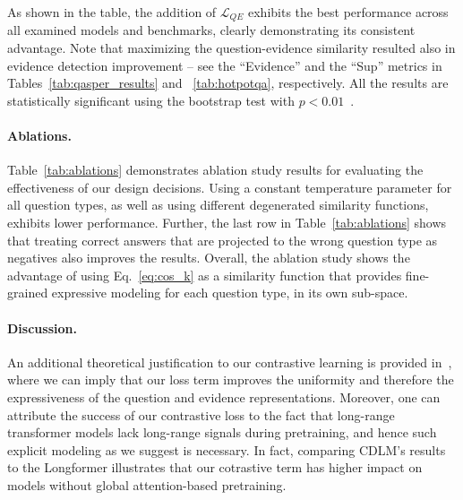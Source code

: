 As shown in the table, the addition of $\mathcal{L}_{QE}$ exhibits the best performance across all examined models and benchmarks, clearly demonstrating its consistent advantage. Note that maximizing the question-evidence similarity resulted also in evidence detection improvement -- see the ``Evidence'' and the ``Sup'' metrics in Tables~\ref{tab:qasper_results} and ~\ref{tab:hotpotqa}, respectively. All the results are statistically significant using the bootstrap test with ${p<0.01}$~\cite{dror-etal-2018-hitchhikers}.

\paragraph{Ablations.} Table~\ref{tab:ablations} demonstrates ablation study results for evaluating the effectiveness of our design decisions. Using a constant temperature parameter for all question types, as well as using different degenerated similarity functions, exhibits lower performance. Further, the last row in Table~\ref{tab:ablations} shows that treating correct answers that are projected to the wrong question type as negatives also improves the results.
Overall, the ablation study shows the advantage of using Eq.~\ref{eq:cos_k} as a similarity function that provides fine-grained expressive modeling for each question type, in its own sub-space. 

\paragraph{Discussion.} An additional theoretical justification to our contrastive learning is provided in~\cite{gao-etal-2021-simcse}, where we can imply that our loss term improves the uniformity and therefore the expressiveness of the question and evidence representations. Moreover, one can attribute the success of our contrastive loss to the fact that long-range transformer models lack long-range signals during pretraining, and hence such explicit modeling as we suggest is necessary. In fact, comparing CDLM's results to the Longformer illustrates that our cotrastive term has higher impact on models without global attention-based pretraining.  




